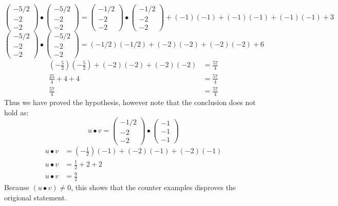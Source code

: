 \documentclass[11pt]{article}
\begin{document}
\begin{equation*}
\begin{pmatrix}
-5/2\\
-2\\
-2
\end{pmatrix}
\bullet
\begin{pmatrix}
-5/2\\
-2\\
-2
\end{pmatrix}
=
\begin{pmatrix}
-1/2 \\
-2\\
-2
\end{pmatrix}
\bullet
\begin{pmatrix}
-1/2 \\
-2\\
-2
\end{pmatrix}
+ (-1)(-1) + (-1)(-1) + (-1)(-1) + 3
\end{equation*}
\begin{equation*}
\begin{pmatrix}
-5/2\\
-2\\
-2
\end{pmatrix}
\bullet
\begin{pmatrix}
-5/2\\
-2\\
-2
\end{pmatrix}
= (-1/2)(-1/2) + (-2)(-2) + (-2)(-2) + 6
\end{equation*}
\begin{align*}
(-\frac{5}{2})(-\frac{5}{2}) + (-2)(-2) + (-2)(-2) &= \frac{57}{4} \\
\frac{25}{4} + 4 + 4 &= \frac{57}{4} \\
\frac{57}{4} &= \frac{57}{4}
\end{align*}
Thus we have proved the hypothesis, however note that the conclusion does not hold as:
\begin{equation*}
u \bullet v =
\begin{pmatrix}
-1/2\\
-2\\
-2
\end{pmatrix}
\bullet
\begin{pmatrix}
-1\\
-1\\
-1
\end{pmatrix}
\end{equation*}
\begin{align*}
u \bullet v &= (-\frac{1}{2})(-1) + (-2)(-1) + (-2)(-1) \\
u \bullet v &= \frac{1}{2} + 2 + 2 \\
u \bullet v &= \frac{9}{2} 
\end{align*}
Because $(u \bullet v) \neq 0$, this shows that the counter examples disproves the origional statement.
\end{document}
